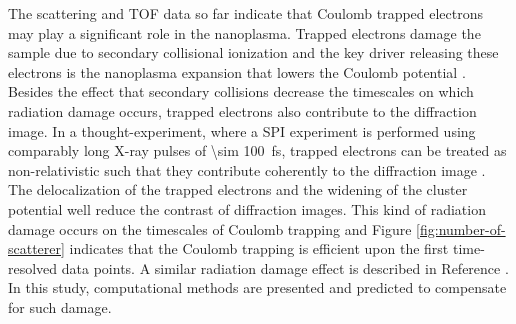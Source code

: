 %
The scattering and TOF data so far indicate that Coulomb trapped electrons may play a significant role in the nanoplasma. Trapped electrons damage the sample due to secondary collisional ionization \cite{Hau-Riege-2004-PRE} and the key driver releasing these electrons is the nanoplasma expansion that lowers the Coulomb potential \cite{Arbeiter-2011-NJP}. Besides the effect that secondary collisions decrease the timescales on which radiation damage occurs, trapped electrons also contribute to the diffraction image. In a thought-experiment, where a SPI experiment is performed using comparably long X-ray pulses of \SI{\sim 100}{\femto\second}, trapped electrons can be treated as non-relativistic such that they contribute coherently to the diffraction image \cite{Williams-2016-PC}. The delocalization of the trapped electrons and the widening of the cluster potential well reduce the contrast of diffraction images. This kind of radiation damage occurs on the timescales of Coulomb trapping and Figure \ref{fig:number-of-scatterer} indicates that the Coulomb trapping is efficient upon the first time-resolved data points. A similar radiation damage effect is described in Reference \citep{Quiney-2010-NatPhys}. In this study, computational methods are presented and predicted to compensate for such damage.\\[1\baselineskip]
%
